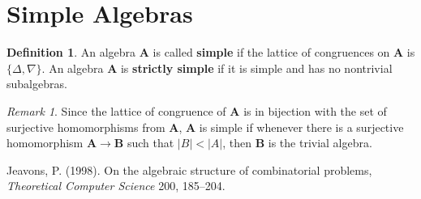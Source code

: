 \documentclass{amsart}
\theoremstyle{plain}
\theoremstyle{definition}
\newtheorem{definition}[theorem]{Definition}
\theoremstyle{remark}
\newtheorem{remark}[theorem]{Remark}
\begin{document}
\section{Simple Algebras}
\begin{definition}
    An algebra $\mathbf{A}$ is called \textbf{simple} if the lattice of congruences on $\mathbf{A}$ is $\{\Delta, \nabla \}$. 
    An algebra $\mathbf{A}$ is \textbf{strictly simple} if it is simple and has no nontrivial subalgebras. 
\end{definition}

\begin{remark}
    Since the lattice of congruence of $\mathbf{A}$ is in bijection with the set of surjective homomorphisms from $\mathbf{A}$, 
    $\mathbf{A}$ is simple if whenever there is a surjective homomorphism $\mathbf{A} \to \mathbf{B}$ such that $|B| < |A|$, then $\mathbf{B}$ is the trivial algebra. 
\end{remark}


\begin{thebibliography}{9}
    
       Jeavons, P. (1998). On the algebraic structure of combinatorial problems, \emph{Theoretical Computer Science} 200, 185–204.
 \end{thebibliography}
\end{document}
